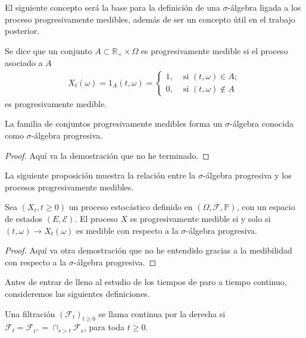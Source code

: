 El siguiente concepto será la base para la definición de una $\sigma$-álgebra ligada a los proceso progresivamente medibles, además de ser un concepto útil en el trabajo posterior.

\begin{definition}
	Se dice que un conjunto $A \subset \mathbb{R}_{+} \times \Omega$ es progresivamente medible si el proceso asociado a $A$
	\begin{align*}
	X_t(\omega) = 1_A (t, \omega) =
	\begin{cases}
	1, & \text{ si } (t, \omega) \in A; \\
	0, & \text{ si } (t, \omega) \notin A
	\end{cases}
	\end{align*}
	es progresivamente medible.
\end{definition}

\begin{proposition}
	La familia de conjuntos progresivamente medibles forma un $\sigma$-álgebra conocida como $\sigma$-álgebra progresiva.
\end{proposition}
\begin{proof}
	Aquí va la demostración que no he terminado.
\end{proof}

La siguiente proposición muestra la relación entre la $\sigma$-álgebra progresiva y los procesos progresivamente medibles.

\begin{proposition}
	Sea $(X_t, t \geq 0)$ un proceso estocástico definido en $(\Omega, \mathcal{F}, \mathbb{P})$, con un espacio de estados $(E, \mathcal{E})$. El proceso $X$ es progresivamente medible si y solo si $(t, \omega) \rightarrow X_t(\omega)$ es medible con respecto a la $\sigma$-álgebra progresiva.
\end{proposition}
\begin{proof}
	Aquí va otra demostración que no he entendido gracias a la medibilidad con respecto a la $\sigma$-álgebra progresiva.
\end{proof}

Antes de entrar de lleno al estudio de los tiempos de paro a tiempo continuo, consideremos las siguientes definiciones.
\begin{definition}
	Una filtración $(\mathcal{F}_t)_{t \geq 0}$ se llama continua por la derecha si $\mathcal{F}_t = \mathcal{F}_{t^{+}} = \cap_{s > t} \mathcal{F}_s$, para toda $t \geq 0$.
\end{definition}

